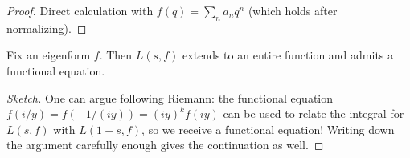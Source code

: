 \documentclass[../notes.tex]{subfiles}
\begin{document}
\begin{proof}
	Direct calculation with $f(q)=\sum_na_nq^n$ (which holds after normalizing).
\end{proof}
\begin{theorem}
	Fix an eigenform $f$. Then $L(s,f)$ extends to an entire function and admits a functional equation.
\end{theorem}
\begin{proof}[Sketch]
	One can argue following Riemann: the functional equation $f(i/y)=f(-1/(iy))=(iy)^kf(iy)$ can be used to relate the integral for $L(s,f)$ with $L(1-s,f)$, so we receive a functional equation! Writing down the argument carefully enough gives the continuation as well.
\end{proof}
\end{document}
